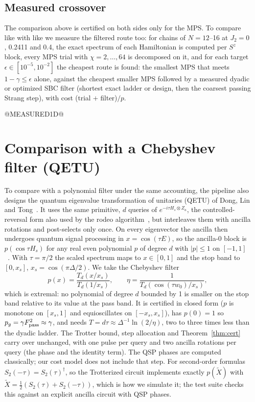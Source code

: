 \documentclass[aps,pra,twocolumn,superscriptaddress,nofootinbib]{revtex4-2}
\begin{document}
\subsection{Measured crossover}
\label{sec:crossover1d}

The comparison above is certified on both sides only for the MPS. To compare like with like we measure the
filtered route too: for chains of $N=12$--16 at $J_2=0$, 0.2411 and 0.4, the exact spectrum of each
Hamiltonian is computed per $S^z$ block, every MPS trial with $\chi=2,\dots,64$ is decomposed on it, and for
each target $\epsilon\in[10^{-5},10^{-2}]$ the cheapest route is found: the smallest MPS that meets
$1-\gamma\le\epsilon$ alone, against the cheapest smaller MPS followed by a measured dyadic or optimized SBC
filter (shortest exact ladder or design, then the coarsest passing Strang step), with cost (trial $+$
filter)$/p$.

@MEASURED1D@

\section{Comparison with a Chebyshev filter (QETU)}
\label{sec:qetu}

To compare with a polynomial filter under the same accounting, the pipeline also
designs the quantum eigenvalue transformation of unitaries (QETU) of Dong, Lin and Tong~\cite{Dong2022}.
It uses the same primitive, $d$ queries of $e^{-i\tau H_s\otimes Z_a}$, the controlled-reversal form
also used by the rodeo algorithm~\cite{BeeLindgren2025}, but interleaves them with ancilla rotations
and post-selects only once. On every eigenvector the ancilla then undergoes quantum signal processing in
$x=\cos(\tau E)$, so the ancilla-0 block is $p(\cos\tau H_s)$ for any real even polynomial $p$ of degree
$d$ with $|p|\le1$ on $[-1,1]$~\cite{Dong2022}. With $\tau=\pi/2$ the scaled spectrum maps to $x\in[0,1]$
and the stop band to $[0,x_s]$, $x_s=\cos(\pi\Delta/2)$. We take the Chebyshev filter
\begin{equation}
p(x)=\frac{T_d(x/x_s)}{T_d(1/x_s)},\qquad \eta=\frac1{T_d(\cos(\tau w_0)/x_s)},
\end{equation}
which is extremal: no polynomial of degree $d$ bounded by 1 is smaller on the stop band relative to its
value at the pass band. It is certified in closed form ($p$ is monotone on $[x_s,1]$ and equioscillates
on $[-x_s,x_s]$), has $p(0)=1$ so $p_g=\gamma F_{\rm pass}^2\approx\gamma$, and needs
$T=d\tau\approx\Delta^{-1}\ln(2/\eta)$, two to three times less than the dyadic ladder. The Trotter bound,
step allocation and Theorem~\ref{thm:cert} carry over unchanged, with one pulse per query and two ancilla
rotations per query (the phase and the identity term). The QSP phases are computed classically; our
cost model does not include that step. For second-order formulas $S_2(-\tau)=S_2(\tau)^\dagger$, so the
Trotterized circuit implements exactly $p(\tilde X)$ with $\tilde X=\frac12(S_2(\tau)+S_2(-\tau))$, which is
how we simulate it; the test suite checks this against an explicit ancilla circuit with QSP phases.
\end{document}
